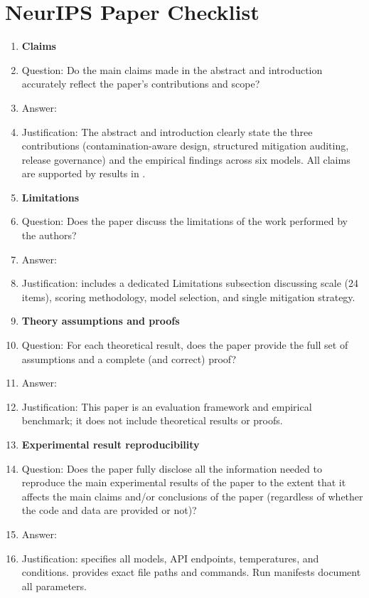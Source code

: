 \section*{NeurIPS Paper Checklist}

\begin{enumerate}

\item {\bf Claims}
    \item[] Question: Do the main claims made in the abstract and introduction accurately reflect the paper's contributions and scope?
    \item[] Answer: \answerYes{}
    \item[] Justification: The abstract and introduction clearly state the three contributions (contamination-aware design, structured mitigation auditing, release governance) and the empirical findings across six models. All claims are supported by results in .

\item {\bf Limitations}
    \item[] Question: Does the paper discuss the limitations of the work performed by the authors?
    \item[] Answer: \answerYes{}
    \item[] Justification:  includes a dedicated Limitations subsection discussing scale (24 items), scoring methodology, model selection, and single mitigation strategy.

\item {\bf Theory assumptions and proofs}
    \item[] Question: For each theoretical result, does the paper provide the full set of assumptions and a complete (and correct) proof?
    \item[] Answer: \answerNA{}
    \item[] Justification: This paper is an evaluation framework and empirical benchmark; it does not include theoretical results or proofs.

    \item {\bf Experimental result reproducibility}
    \item[] Question: Does the paper fully disclose all the information needed to reproduce the main experimental results of the paper to the extent that it affects the main claims and/or conclusions of the paper (regardless of whether the code and data are provided or not)?
    \item[] Answer: \answerYes{}
    \item[] Justification:  specifies all models, API endpoints, temperatures, and conditions.  provides exact file paths and commands. Run manifests document all parameters.



\end{enumerate}
